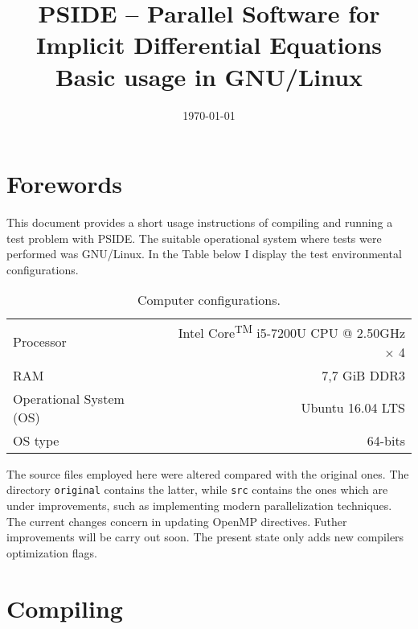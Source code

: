 \documentclass[a4paper,11pt]{article}
\title{{\LARGE \textbf{PSIDE -- Parallel Software for Implicit Differential Equations}}\\ 
{Basic usage in GNU/Linux}
 }%
\date{\today}
\theoremstyle{comm}
\begin{document}
\maketitle


\section{Forewords}

This document provides a short usage instructions of compiling and running a test problem with PSIDE. The suitable operational system where tests were performed was GNU/Linux. In the Table below I display the test environmental configurations.

\begin{table}[h]
\centering
{\fontsize{10}{12}\selectfont
\begin{tabular}{l | r} \toprule \toprule
Processor 	&  Intel\textsuperscript{\tiny{\textregistered}} Core\textsuperscript{\tiny{TM}} i5-7200U CPU @ 2.50GHz $\times$ 4  \\[0.3em] 
RAM &  7,7 GiB DDR3 \\[0.3em] 
Operational System (OS) &  Ubuntu 16.04 LTS \\[0.3em]
OS type &  64-bits \\
\bottomrule \bottomrule
\end{tabular}}
\caption{Computer configurations.}\label{pcconfig}
\end{table}

The source files employed here were altered compared with the original ones. The directory \texttt{original} contains the latter, while \texttt{src} contains the ones which are under improvements, such as implementing modern parallelization techniques. The current changes concern in updating OpenMP directives. Futher improvements will be carry out soon. The present state only adds new compilers optimization flags.

\section{Compiling}
\end{document}
